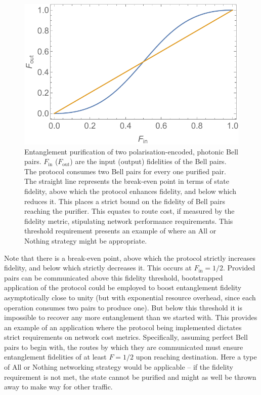 \documentclass[aps,rmp,twocolumn,amsmath,amssymb,nofootinbib,superscriptaddress]{revtex4}
\begin{document}
\begin{figure}[!htb]
\includegraphics[width=\columnwidth]{ent_purif}
\caption{Entanglement purification of two polarisation-encoded, photonic Bell pairs. $F_\mathrm{in}$ ($F_\mathrm{out}$) are the input (output) fidelities of the Bell pairs. The protocol consumes two Bell pairs for every one purified pair. The straight line represents the break-even point in terms of state fidelity, above which the protocol enhances fidelity, and below which reduces it. This places a strict bound on the fidelity of Bell pairs reaching the purifier. This equates to route cost, if measured by the fidelity metric, stipulating network performance requirements. This threshold requirement presents an example of where an {\sc All or Nothing} strategy might be appropriate.} \label{fig:ent_purif}
\end{figure}

Note that there is a break-even point, above which the protocol strictly increases fidelity, and below which strictly decreases it. This occurs at \mbox{$F_\mathrm{in}=1/2$}. Provided pairs can be communicated above this fidelity threshold, bootstrapped application of the protocol could be employed to boost entanglement fidelity asymptotically close to unity (but with exponential resource overhead, since each operation consumes two pairs to produce one). But below this threshold it is impossible to recover any more entanglement than we started with. This provides an example of an application where the protocol being implemented dictates strict requirements on network cost metrics. Specifically, assuming perfect Bell pairs to begin with, the routes by which they are communicated must ensure entanglement fidelities of at least \mbox{$F=1/2$} upon reaching destination. Here a type of {\sc All or Nothing} networking strategy would be applicable -- if the fidelity requirement is not met, the state cannot be purified and might as well be thrown away to make way for other traffic.
\end{document}
